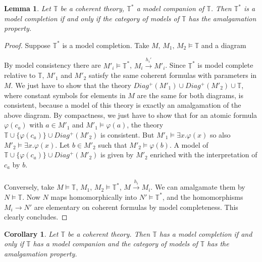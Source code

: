 \documentclass{article}
\newtheorem{Lemma}[theorem]{Lemma}
\newtheorem{corollary}[theorem]{Corollary}
\newcommand{\T}{\mathbb{T}}
\renewcommand{\phi}{\varphi}
\begin{document}
\begin{Lemma}\label{completion_amalg}
    Let $\T$ be a coherent theory, $\T^*$ a model companion of $\T$. Then $\T^*$ is a model completion if and only if the category of models of $\T$ has the amalgamation property.
\end{Lemma}
\begin{proof}
    Suppose $\T^*$ is a model completion. Take $M,\, M_1,\, M_2\models \T$ and a diagram
        \begin{center}
    \end{center}
    By model consistency there are $M'_i\models \T^*$, $M_i\xrightarrow{h_i'} M'_i$. Since $\T^*$ is model complete relative to $\T$, $M'_1$ and $M'_2$ satisfy the same coherent formulas with parameters in $M$. We just have to show that the theory $Diag^+(M'_1)\cup Diag^+(M'_2)\cup\T$, where constant symbols for elements in $M$ are the same for both diagrams, is consistent, because a model of this theory is exactly an amalgamation of the above diagram. By compactness, we just have to show that for an atomic formula $\phi(c_a)$ with $a\in M'_1$ and $M'_1\models\phi(a)$, the theory $\T\cup\{\phi(c_a)\}\cup Diag^+(M'_2)$ is consistent. But $M'_1\models\exists x.\phi(x)$ so also $M'_2\models\exists x.\phi(x)$. Let $b\in M'_2$ such that $M'_2\models\phi(b)$. A model of $\T\cup\{\phi(c_a)\}\cup Diag^+(M'_2)$ is given by $M'_2$ enriched with the interpretation of $c_a$ by $b$.\\
    \\
    Conversely, take $M\models \T$, $M_1,\, M_2\models \T^*$, $M\xrightarrow{h_i} M_i$. We can amalgamate them by $N\models \T$. Now $N$ maps homomorphically into $N'\models\T^*$, and the homomorphisms $M_i\xrightarrow{}N'$ are elementary on coherent formulas by model completeness. This clearly concludes.
\end{proof}

\begin{corollary}
    Let $\T$ be a coherent theory. Then $\T$ has a model completion if and only if $\T$ has a model companion and the category of models of $\T$ has the amalgamation property.
\end{corollary}
\end{document}

